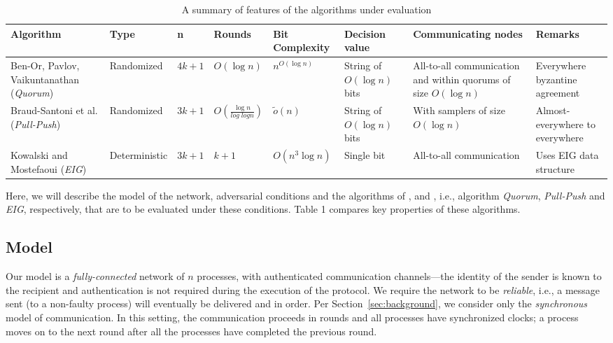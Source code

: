 \begin{table*}[t]
    \caption{A summary of features of the algorithms under evaluation}
    \scriptsize
        \begin{tabular}{p{2.5cm}llllp{1.5cm}p{3.5cm}p{2cm}}
\hline
\textbf{Algorithm} & \textbf{Type} &\textbf{n} & \textbf{Rounds} & \textbf{Bit Complexity } &\textbf{Decision value} & \textbf{Commun\-icating nodes}& \textbf{Remarks} \\ \hline
Ben-Or, Pavlov, Vaikuntanathan \cite{BPV06} (\textit{Quorum})& Randomized & $4k + 1$ & $O(\log n)$ & $n^{O(\log n)}$      &String of $O(\log n)$ bits &All-to-all communication and within quorums of size $O(\log n)$   & Everywhere byzantine agreement     \\
          Braud-Santoni et al. \cite{BGH13} (\textit{Pull-Push}) & Randomized & $3k + 1$ & $O(\frac{\log n}{log\; log n})$ & $\tilde{o}(n)$      &String of $O(\log n)$ bits &With samplers of size $O(\log n)$  & Almost-everywhere to everywhere     \\
                Kowalski and Mostefaoui \cite{KM13} (\textit{EIG}) & Deterministic & $3k + 1$     & $k + 1$                     & $O(n^3\log n)$ &Single bit  &All-to-all communication & Uses EIG data structure\\ \hline
%
\end{tabular}
\end{table*}
Here, we will describe the model of the network, adversarial conditions and the algorithms of \cite{BPV06}, \cite{BGH13} and \cite{KM13}, i.e., algorithm \textit{Quorum}, \textit{Pull-Push} and \textit{EIG}, respectively, that are to be evaluated under these conditions. Table 1 compares key properties of these algorithms.


\subsection{Model}
Our model is a \textit{fully-connected} network of $n$ processes, with authenticated communication channels---the identity of the sender is known to the recipient and authentication is not required during the execution of the protocol. We require the network to be \textit{reliable}, i.e., a message sent (to a non-faulty process) will eventually be delivered and in order. Per Section~\ref{sec:background}, we consider only the \textit{synchronous} model of communication. In this setting, the communication proceeds in rounds and all processes have synchronized clocks; a process moves on to the next round after all the processes have completed the previous round. %

